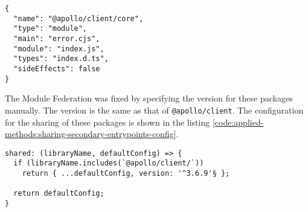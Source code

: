 \ifshowListings
\begin{listing}[H]
  \begin{verbatim}
{
  "name": "@apollo/client/core",
  "type": "module",
  "main": "error.cjs",
  "module": "index.js",
  "types": "index.d.ts",
  "sideEffects": false
}
    \end{verbatim}
    \caption{The \texttt{package.json} of \texttt{@apollo/client/core}.}\label{code:applied-methods:package-json-apollo-client-core}
\end{listing}
\fi

\noindent The Module Federation was fixed by specifying the version for these packages manually. The version is the same as that of \texttt{@apollo/client}. The configuration for the sharing of these packages is shown in the listing \ref{code:applied-methods:sharing-secondary-entrypoints-config}. 

\ifshowListings
\begin{listing}[H]
  \begin{verbatim}
shared: (libraryName, defaultConfig) => {
  if (libraryName.includes(`@apollo/client/`))
    return { ...defaultConfig, version: '^3.6.9'§ };

  return defaultConfig;
}
    \end{verbatim}
    \caption{Specifying the version for the secondary entry points for the \texttt{@apollo/client} package.}\label{code:applied-methods:sharing-secondary-entrypoints-config}
\end{listing}
\fi
